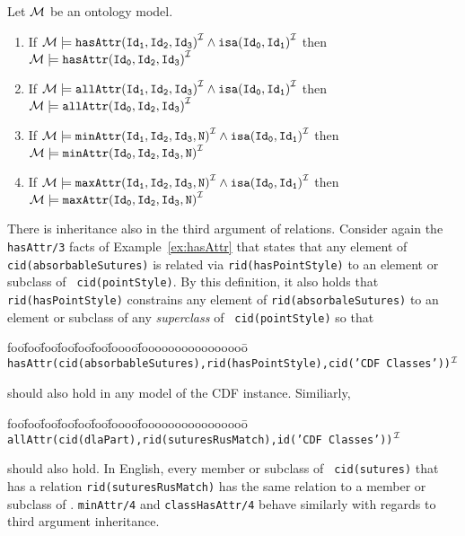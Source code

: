 \begin{proposition} \label{prop:inh1}\rm
Let ${\cal M}$ be an ontology model.
\begin{enumerate}
\item If ${\cal M} \models {\tt hasAttr(Id_1,Id_2,Id_3)}^{{\cal I}} \wedge
						{\tt isa(Id_0,Id_1)}^{{\cal I}}$ 
	then ${\cal M} \models  {\tt hasAttr(Id_0,Id_2,Id_3)}^{{\cal I}}$
%
\item If ${\cal M} \models {\tt allAttr(Id_1,Id_2,Id_3)}^{{\cal I}} \wedge
					    {\tt isa(Id_0,Id_1)}^{{\cal I}}$ 
		then ${\cal M} \models {\tt allAttr(Id_0,Id_2,Id_3)}^{{\cal I}}$ 
\item If ${\cal M} \models {\tt minAttr(Id_1,Id_2,Id_3,N)}^{{\cal I}} \wedge
						{\tt isa(Id_0,Id_1)}^{{\cal I}}$ 
	then ${\cal M} \models  {\tt minAttr(Id_0,Id_2,Id_3,N)}^{{\cal I}}$
%
\item If ${\cal M} \models {\tt maxAttr(Id_1,Id_2,Id_3,N)}^{{\cal I}} \wedge
					    {\tt isa(Id_0,Id_1)}^{{\cal I}}$ 
		then ${\cal M} \models {\tt maxAttr(Id_0,Id_2,Id_3,N)}^{{\cal I}}$ 
%
%
\end{enumerate}
\end{proposition}



There is inheritance also in the third argument of relations.
Consider again the {\tt hasAttr/3} facts of Example~\ref{ex:hasAttr}
that states that any element of {\tt cid(absorbableSutures)} is
related via {\tt rid(hasPointStyle)} to an element or subclass of {\tt
cid(pointStyle)}.  By this definition, it also holds that {\tt
rid(hasPointStyle)} constrains any element of {\tt rid(absorbaleSutures)}
to an element or subclass of any {\em superclass} of {\tt
cid(pointStyle)} so that
{\small 
\begin{tabbing}
foo\=foo\=foo\=foo\=foo\=foo\=foooo\=foooooooooooooooo\=\kill
\> 
{\tt hasAttr(cid(absorbableSutures),rid(hasPointStyle),cid('CDF Classes'))}$^{{\cal I}}$
\end{tabbing} }
\noindent
should also hold in any model of the CDF instance.  
Similiarly,
{\small 
\begin{tabbing}
foo\=foo\=foo\=foo\=foo\=foo\=foooo\=foooooooooooooooo\=\kill
\> 
{\tt allAttr(cid(dlaPart),rid(suturesRusMatch),id('CDF Classes'))$^{{\cal I}}$}
\end{tabbing} }
\noindent
should also hold.  In English, every member or subclass of {\tt
cid(sutures)} that has a relation {\tt rid(suturesRusMatch)} has the
same relation to a member or subclass of {\tt {}}.
{\tt minAttr/4} and {\tt classHasAttr/4} behave similarly with regards
to third argument inheritance.

